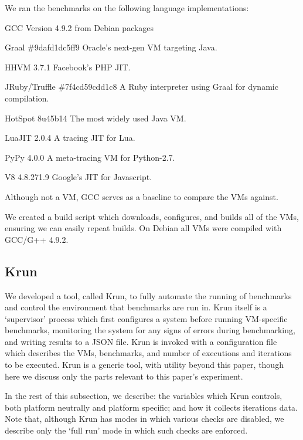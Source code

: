 \documentclass[10pt,preprint]{sigplanconf}
\newcommand{\krun}{Krun\xspace}
\begin{document}
We ran the benchmarks on the following language implementations:
\begin{description*}
\item[GCC] Version 4.9.2 from Debian packages
\item[Graal \#9dafd1dc5ff9] Oracle's next-gen VM targeting Java.
\item[HHVM 3.7.1] Facebook's PHP JIT.
\item[JRuby/Truffle \#7f4cd59cdd1c8] A Ruby interpreter using Graal for dynamic compilation.
\item[HotSpot 8u45b14] The most widely used Java VM.
\item[LuaJIT 2.0.4] A tracing JIT for Lua.
\item[PyPy 4.0.0] A meta-tracing VM for Python-2.7.
\item[V8 4.8.271.9] Google's JIT for Javascript.
\end{description*}
%
Although not a VM, GCC serves as a baseline to compare the VMs against.

We created a build script which downloads, configures, and builds all of the
VMs, ensuring we can easily repeat builds.
On Debian all VMs were compiled with GCC/G++ 4.9.2.


\subsection{\krun}

We developed a tool, called \krun, to fully automate the running of benchmarks
and control the environment that benchmarks are run in. \krun itself is a
`supervisor' process which first configures a system before running VM-specific
benchmarks, monitoring the system for any signs of errors during benchmarking,
and writing results to a JSON file. \krun is invoked with a configuration file
which describes the VMs, benchmarks, and number of executions and iterations to
be executed. \krun is a generic tool, with utility beyond this paper, though
here we discuss only the parts relevant to this paper's experiment. 

In the rest
of this subsection, we describe: the variables which \krun controls, both
platform neutrally and platform specific; and how it collects iterations data.
Note that, although \krun has modes in which various checks are disabled, we
describe only the `full run' mode in which such checks are enforced.
\end{document}
